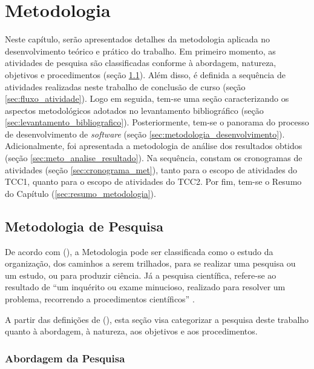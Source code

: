 \chapter[Metodologia]{Metodologia}

\label{chap:metodologia}

Neste capítulo, serão apresentados detalhes da metodologia aplicada no desenvolvimento teórico e prático do trabalho. Em primeiro momento, as atividades de pesquisa são classificadas conforme à abordagem, natureza, objetivos e procedimentos (seção \ref{sec:met_pesquisa}). Além disso, é definida a sequência de atividades realizadas neste trabalho de conclusão de curso (seção \ref{sec:fluxo_atividade}). Logo em seguida, tem-se uma seção caracterizando os aspectos metodológicos adotados no levantamento bibliográfico (seção \ref{sec:levantamento_bibliografico}). Posteriormente, tem-se o panorama do processo de desenvolvimento de \textit{software} (seção \ref{sec:metodologia_desenvolvimento}). Adicionalmente, foi apresentada a metodologia de análise dos resultados obtidos (seção \ref{sec:meto_analise_resultado}). Na sequência, constam os cronogramas de atividades (seção \ref{sec:cronograma_met}), tanto para o escopo de atividades do TCC1, quanto para o escopo de atividades do TCC2. Por fim, tem-se o Resumo do Capítulo (\ref{sec:resumo_metodologia}).

\section{Metodologia de Pesquisa}
\label{sec:met_pesquisa}
De acordo com  (\citeyear{gerhardt2009metodos}), a Metodologia pode ser classificada como o estudo da organização, dos caminhos a serem trilhados, para se realizar uma pesquisa ou um estudo, ou para produzir ciência. Já a pesquisa científica, refere-se ao resultado de “um inquérito ou exame minucioso, realizado para resolver um problema, recorrendo a procedimentos científicos” \cite{gerhardt2009metodos}.

A partir das definições de  (\citeyear{gerhardt2009metodos}), esta seção visa categorizar a pesquisa deste trabalho quanto à abordagem, à natureza, aos objetivos e aos procedimentos.

\subsection{Abordagem da Pesquisa}

